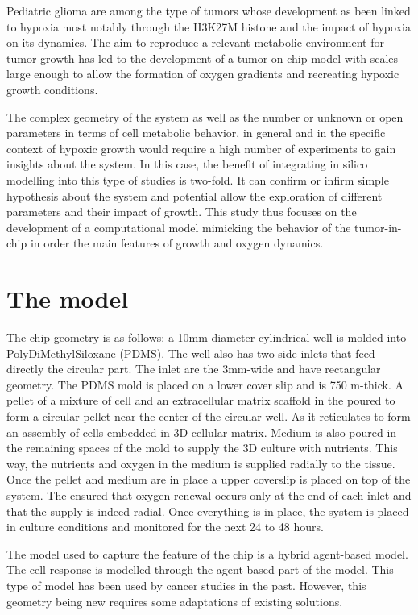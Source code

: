 \documentclass[11pt,a4paper]{article}
\begin{document}
Pediatric glioma are among the type of tumors whose development as been linked to hypoxia most notably through the H3K27M histone and the impact of hypoxia on its dynamics. The aim to reproduce a relevant metabolic environment for tumor growth has led to the development of a tumor-on-chip model with scales large enough to allow the formation of oxygen gradients and recreating hypoxic growth conditions.

The complex geometry of the system as well as the number or unknown or open parameters in terms of cell metabolic behavior, in general and in the specific context of hypoxic growth would require a high number of experiments to gain insights about the system. In this case, the benefit of integrating in silico modelling into this type of studies is two-fold. It can confirm or infirm simple hypothesis about the system and potential allow the exploration of different parameters and their impact of growth. This study thus focuses on the development of a computational model mimicking the behavior of the tumor-in-chip in order the main features of growth and oxygen dynamics.

\section{The model}
The chip geometry is as follows: a 10mm-diameter cylindrical well is molded into PolyDiMethylSiloxane (PDMS). The well also has two side inlets that feed directly the circular part. The inlet are the 3mm-wide and have rectangular geometry. The PDMS mold is placed on a lower cover slip and is 750 \textmu m-thick. A pellet of a mixture of cell and an extracellular matrix scaffold in the poured to form a circular pellet near the center of the circular well. As it reticulates to form an assembly of cells embedded in 3D cellular matrix. Medium is also poured in the remaining spaces of the mold to supply the 3D culture with nutrients. This way, the nutrients and oxygen in the medium is supplied radially to the tissue. Once the pellet and medium are in place a upper coverslip is placed on top of the system. The ensured that oxygen renewal occurs only at the end of each inlet and that the supply is indeed radial. Once everything is in place, the system is placed in culture conditions and monitored for the next 24 to 48 hours.

The model used to capture the feature of the chip is a hybrid agent-based model.  The cell response is modelled through the agent-based part of the model. This type of model has been used by cancer studies in the past. However, this geometry being new requires some adaptations of existing solutions.
\end{document}
